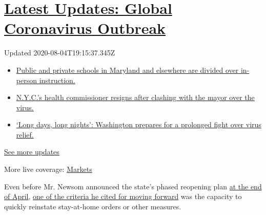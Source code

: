 \hypertarget{latest-updates-global-coronavirus-outbreak}{%
\section{\texorpdfstring{\href{https://www.nytimes.com/2020/08/04/world/coronavirus-cases.html?action=click\&pgtype=Article\&state=default\&region=MAIN_CONTENT_1\&context=storylines_live_updates}{Latest
Updates: Global Coronavirus
Outbreak}}{Latest Updates: Global Coronavirus Outbreak}}\label{latest-updates-global-coronavirus-outbreak}}

Updated 2020-08-04T19:15:37.345Z

\begin{itemize}
\tightlist
\item
  \href{https://www.nytimes.com/2020/08/04/world/coronavirus-cases.html?action=click\&pgtype=Article\&state=default\&region=MAIN_CONTENT_1\&context=storylines_live_updates\#link-4825b93}{Public
  and private schools in Maryland and elsewhere are divided over
  in-person instruction.}
\item
  \href{https://www.nytimes.com/2020/08/04/world/coronavirus-cases.html?action=click\&pgtype=Article\&state=default\&region=MAIN_CONTENT_1\&context=storylines_live_updates\#link-4d1eafa8}{N.Y.C.'s
  health commissioner resigns after clashing with the mayor over the
  virus.}
\item
  \href{https://www.nytimes.com/2020/08/04/world/coronavirus-cases.html?action=click\&pgtype=Article\&state=default\&region=MAIN_CONTENT_1\&context=storylines_live_updates\#link-6b644638}{`Long
  days, long nights': Washington prepares for a prolonged fight over
  virus relief.}
\end{itemize}

\href{https://www.nytimes.com/2020/08/04/world/coronavirus-cases.html?action=click\&pgtype=Article\&state=default\&region=MAIN_CONTENT_1\&context=storylines_live_updates}{See
more updates}

More live coverage:
\href{https://www.nytimes.com/live/2020/08/04/business/stock-market-today-coronavirus?action=click\&pgtype=Article\&state=default\&region=MAIN_CONTENT_1\&context=storylines_live_updates}{Markets}

Even before Mr. Newsom announced the state's phased reopening plan
\href{https://www.nytimes.com/2020/04/29/us/california-reopen-coronavirus.html}{at
the end of April},
\href{https://www.nytimes.com/2020/04/15/us/coronavirus-california-quarantine-end.html}{one
of the criteria he cited for moving forward} was the capacity to quickly
reinstate stay-at-home orders or other measures.

